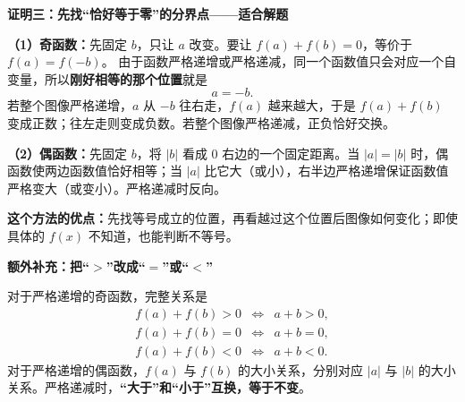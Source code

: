 \begin{proofbox}
\textbf{\textcolor{CProof}{证明三：先找“恰好等于零”的分界点——适合解题}}



\textbf{（1）奇函数：}先固定 $b$，只让 $a$ 改变。要让 $f(a)+f(b)=0$，等价于 $f(a)=f(-b)$。
由于函数严格递增或严格递减，同一个函数值只会对应一个自变量，所以\textbf{刚好相等的那个位置}就是
\[
 a=-b.
\]
若整个图像严格递增，$a$ 从 $-b$ 往右走，$f(a)$ 越来越大，于是 $f(a)+f(b)$ 变成正数；往左走则变成负数。若整个图像严格递减，正负恰好交换。

\textbf{（2）偶函数：}先固定 $b$，将 $|b|$ 看成 $0$ 右边的一个固定距离。当 $|a|=|b|$ 时，偶函数使两边函数值恰好相等；当 $|a|$ 比它大（或小），右半边严格递增保证函数值严格变大（或变小）。严格递减时反向。

\textbf{这个方法的优点：}先找等号成立的位置，再看越过这个位置后图像如何变化；即使具体的 $f(x)$ 不知道，也能判断不等号。

\medskip
\textbf{\textcolor{CProof}{额外补充：把“$>$”改成“$=$”或“$<$”}}

对于严格递增的奇函数，完整关系是
\[
\begin{array}{rcl}
 f(a)+f(b)>0&\iff&a+b>0,\\
 f(a)+f(b)=0&\iff&a+b=0,\\
 f(a)+f(b)<0&\iff&a+b<0.
\end{array}
\]
对于严格递增的偶函数，$f(a)$ 与 $f(b)$ 的大小关系，分别对应 $|a|$ 与 $|b|$ 的大小关系。严格递减时，\textbf{“大于”和“小于”互换，等于不变}。
\end{proofbox}
